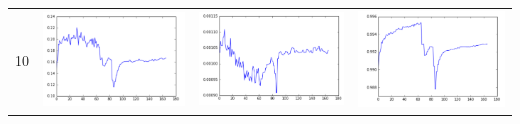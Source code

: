 \documentclass[14pt, a4paper]{extarticle}
\begin{document}
\begin{table}[!htb]
{\begin{tabular}{|c|c|c|c|}
\hline
10 & \includegraphics[scale=0.3]{images/ks_10.png} & \includegraphics[scale=0.3]{images/cvm_10.png} & \includegraphics[scale=0.3]{images/auc_10.png} \\

\end{tabular}}
\end{table}
\end{document}
